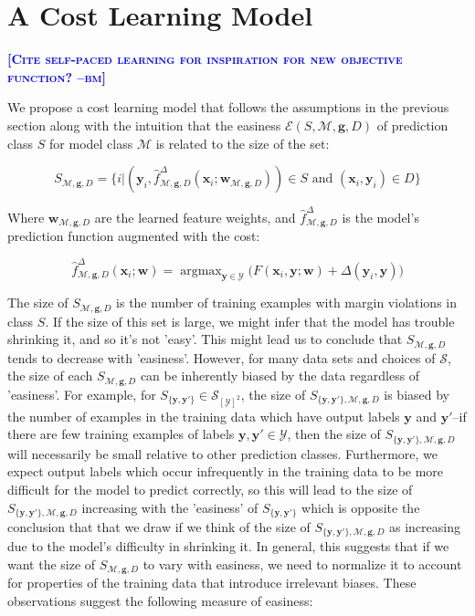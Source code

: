 \documentclass{article} %
\DeclareMathOperator*{\argmax}{argmax}
\newcommand{\bmcomment}[1]{\textcolor{blue}{\textsc{\textbf{[#1 --bm]}}}}
\begin{document}
\section{A Cost Learning Model}

\bmcomment{Cite self-paced learning for inspiration for new objective function?}

We propose a cost learning model that follows the assumptions in 
the previous section along with the intuition that the easiness 
$\mathcal{E}(S,\mathcal{M},\mathbf{g},D)$ of prediction class $S$ for 
model class $\mathcal{M}$ is related to the size of the set:

\begin{equation}
S_{\mathcal{M},\mathbf{g},D}=\{i | (\mathbf{y}_i,\hat{f}^\Delta_{\mathcal{M},\mathbf{g},D}(\mathbf{x}_i;\mathbf{w}_{\mathcal{M},\mathbf{g},D}))\in S\text{ and }(\mathbf{x}_i,\mathbf{y}_i)\in D\}
\end{equation}

Where $\mathbf{w}_{\mathcal{M},\mathbf{g},D}$ are the learned feature weights,
and $\hat{f}^\Delta_{\mathcal{M},\mathbf{g},D}$ is the model's prediction
function augmented with the cost:

\begin{equation}
\hat{f}^\Delta_{\mathcal{M},\mathbf{g},D}(\mathbf{x}_i;\mathbf{w})=\argmax_{\mathbf{y}\in\mathcal{Y}}\Big( F(\mathbf{x}_i,\mathbf{y};\mathbf{w})
+\Delta(\mathbf{y}_i,\mathbf{y})\Big)
\end{equation}

The size of $S_{\mathcal{M},\mathbf{g},D}$ is the number of
training examples with margin violations in class $S$. If
the size of this set is large, we might infer that the
model has trouble shrinking it, and so it's not 'easy'.  This 
might lead us to conclude that $S_{\mathcal{M},\mathbf{g},D}$ 
tends to decrease with 'easiness'.  However,
for many data sets and choices of $\mathcal{S}$, the size 
of each $S_{\mathcal{M},\mathbf{g},D}$ can be inherently
biased by the data regardless of 'easiness'.  For example, 
for $S_{\{\mathbf{y},\mathbf{y}'\}}\in\mathcal{S}_{[\mathcal{Y}]^2}$, 
the size of $S_{\{\mathbf{y},\mathbf{y}'\},\mathcal{M},\mathbf{g},D}$ 
is biased by the number of examples in the training data which have 
output labels $\mathbf{y}$ and $\mathbf{y}'$--if there are few 
training examples of labels 
$\mathbf{y},\mathbf{y}'\in\mathcal{Y}$, then the size of 
$S_{\{\mathbf{y}, \mathbf{y}'\},\mathcal{M},\mathbf{g},D}$ 
will necessarily be small relative to other prediction classes.
Furthermore, we expect 
output labels which occur infrequently in the training data to 
be more difficult for the model to predict correctly, so this
will lead to the size of 
$S_{\{\mathbf{y},\mathbf{y}'\},\mathcal{M},\mathbf{g},D}$ 
increasing with the 'easiness' of 
$S_{\{\mathbf{y},\mathbf{y}'\}}$ which is opposite the 
conclusion that that we draw if we think of the size of 
$S_{\{\mathbf{y},\mathbf{y}'\},\mathcal{M},\mathbf{g},D}$ as
increasing due to the model's difficulty in shrinking it.  In general, 
this suggests that if we want the size of $S_{\mathcal{M},\mathbf{g},D}$
to vary with easiness, we need to normalize it to account for 
properties of the training data that introduce irrelevant
biases.  These observations suggest the following measure of easiness:
\end{document}

